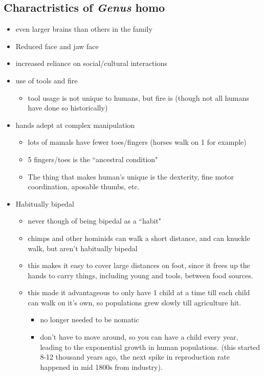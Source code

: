 \documentclass{article}
\theoremstyle{definition}
\begin{document}
\subsection{Charactristics of \textit{Genus} homo}
\begin{itemize}
	\item even larger brains than others in the family
	\item Reduced face and jaw face
	\item increased reliance on social/cultural interactions
	\item use of tools and fire
		\begin{itemize}
			\item tool usage is not unique to humans, but fire is (though not all humans have done so historically)
		\end{itemize}
	\item hands adept at complex manipulation
		\begin{itemize}
			\item lots of mamals have fewer toes/fingers (horses walk on 1 for example)
			\item 5 fingers/toes is the ``ancestral condition"
			\item The thing that makes human's unique is the dexterity, fine motor coordination, aposable thumbs, etc.
		\end{itemize}
	\item Habitually bipedal
		\begin{itemize}
			\item never though of being bipedal as a ``habit"
			\item chimps and other hominids can walk a short distance, and can knuckle walk, but aren't habitually bipedal
			\item this makes it easy to cover large distances on foot, since it frees up the hands to carry things, including young and tools, between food sources.
			\item this made it advantageous to only have 1 child at a time till each child can walk on it's own, so populations grew slowly till agriculture hit.
				\begin{itemize}
					\item no longer needed to be nomatic
					\item don't have to move around, so you can have a child every year, leading to the exponential growth in human populations. (this started 8-12 thousand years ago, the next spike in reproduction rate happened in mid 1800s from industry).
				\end{itemize}
		\end{itemize}
\end{itemize}
\end{document}
